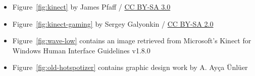 \begin{itemize}
\item Figure~\ref{fig:kinect} by James Pfaff / \href{http://creativecommons.org/licenses/by-sa/3.0/}{CC BY-SA 3.0}
\item Figure~\ref{fig:kinect-gaming} by Sergey Galyonkin / \href{https://creativecommons.org/licenses/by-sa/2.0/}{CC BY-SA 2.0}
\item Figure~\ref{fig:wave-low} contains an image retrieved from Microsoft's Kinect for Windows Human Interface Guidelines v1.8.0
\item Figure~\ref{fig:old-hotspotizer} contains graphic design work by A. Ayça Ünlüer
\end{itemize}

